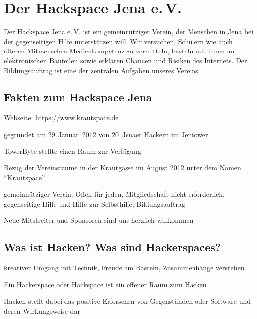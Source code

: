 \documentclass[a4paper,12pt,twoside]{scrartcl}
\begin{document}
\thispagestyle{empty}

\section*{Der Hackspace Jena e.\,V.}
Der Hackspace Jena e.\,V. ist ein gemeinnütziger Verein, der Menschen
in Jena bei der gegenseitigen Hilfe unterstützen will. Wir versuchen,
Schülern wie auch älteren Mitmenschen Medienkompetenz zu vermitteln,
basteln mit ihnen an elektronischen Bauteilen sowie erklären Chancen
und Risiken des Internets. Der Bildungsauftrag ist eine der zentralen
Aufgaben unseres Vereins.

\subsection*{Fakten zum Hackspace Jena}
\begin{compactitem}
\item Webseite: \url{https://www.krautspace.de}
\item gegründet am 29.\,Januar~2012 von 20~Jenaer Hackern im Jentower
\item TowerByte stellte einen Raum zur Verfügung
\item Bezug der Vereinsräume in der Krautgasse im August 2012 unter
  dem Namen \enquote{Krautspace}
\item gemeinnütziger Verein: Offen für jeden, Mitgliedschaft nicht 
  erforderlich, gegenseitige Hilfe und Hilfe zur Selbsthilfe, 
  Bildungsauftrag
\item Neue Mitstreiter und Sponsoren sind uns herzlich willkommen
\end{compactitem}

\subsection*{Was ist Hacken? Was sind Hackerspaces?}
\begin{compactitem}
\item kreativer Umgang mit Technik, Freude am Basteln, Zusammenhänge verstehen
\item Ein Hackerspace oder Hackspace ist ein offener Raum zum Hacken
\item Hacken stellt dabei das positive Erforschen von Gegenständen oder 
  Software und deren Wirkungsweise dar
\end{compactitem}
\end{document}
